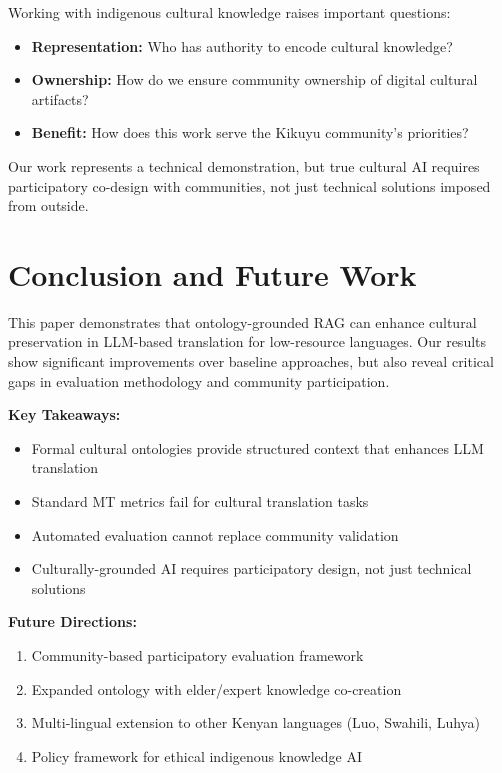 \documentclass[11pt,twocolumn]{article}
\begin{document}
Working with indigenous cultural knowledge raises important questions:
\begin{itemize}
    \item \textbf{Representation:} Who has authority to encode cultural knowledge?
    \item \textbf{Ownership:} How do we ensure community ownership of digital cultural artifacts?
    \item \textbf{Benefit:} How does this work serve the Kikuyu community's priorities?
\end{itemize}

Our work represents a technical demonstration, but true cultural AI requires participatory co-design with communities, not just technical solutions imposed from outside.

\section{Conclusion and Future Work}

This paper demonstrates that ontology-grounded RAG can enhance cultural preservation in LLM-based translation for low-resource languages. Our results show significant improvements over baseline approaches, but also reveal critical gaps in evaluation methodology and community participation.

\textbf{Key Takeaways:}
\begin{itemize}
    \item Formal cultural ontologies provide structured context that enhances LLM translation
    \item Standard MT metrics fail for cultural translation tasks
    \item Automated evaluation cannot replace community validation
    \item Culturally-grounded AI requires participatory design, not just technical solutions
\end{itemize}

\textbf{Future Directions:}
\begin{enumerate}
    \item Community-based participatory evaluation framework
    \item Expanded ontology with elder/expert knowledge co-creation
    \item Multi-lingual extension to other Kenyan languages (Luo, Swahili, Luhya)
    \item Policy framework for ethical indigenous knowledge AI
\end{enumerate}
\end{document}
